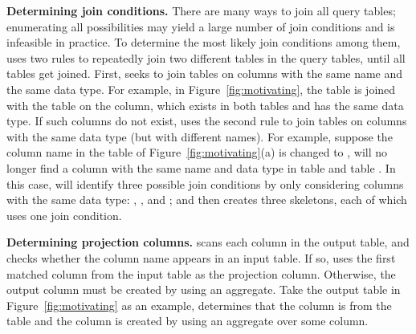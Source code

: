 \vspace{1mm}
{\textbf{Determining join conditions. }} There
are many ways to join all query tables; enumerating
all possibilities may yield a large number of
join conditions and is infeasible in practice. 
To determine the most likely join conditions among them,
\ourtool uses two rules to repeatedly join
two different tables in the query tables,
until all tables get joined.
First, \ourtool seeks to join
tables on columns with the
same name and the same data type. For example,
in Figure~\ref{fig:motivating}, the  table
is joined with the  table on the
 column, which exists in both
tables and has the same data type.
If such columns do not exist,
\ourtool uses the second rule to
join tables on columns with the same data type
(but with different names).
For example, suppose the column name 
in the  table of Figure~\ref{fig:motivating}(a)
is changed to , \ourtool will no longer
find a column with the same name and data type in
table  and table . In this case,
\ourtool will identify three possible join conditions
by only considering columns with the same data type:
, ,
and ; and then creates 
three skeletons, each of which uses one join condition. 

{\textbf{Determining projection columns.}} \ourtool
scans each column in the output table, and checks whether
the column name appears in an input table.
If so, \ourtool uses the first matched column from the input
table as the projection column.
Otherwise, the output column must be created by using an aggregate.
Take the output table in Figure~\ref{fig:motivating} as an
example, \ourtool determines that the  column
is from the  table and
the  column is created by using
an aggregate over some column.





